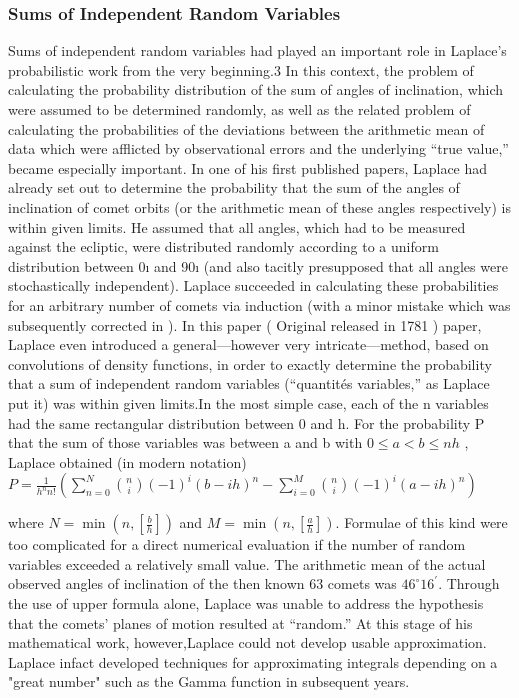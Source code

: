\documentclass{article}
\begin{document}
\subsubsection{Sums of Independent Random Variables}
Sums of independent random variables had played an important role in Laplace’s
probabilistic work from the very beginning.3 In this context, the problem of calculating the probability distribution of the sum of angles of inclination, which were
assumed to be determined randomly, as well as the related problem of calculating
the probabilities of the deviations between the arithmetic mean of data which were
afflicted by observational errors and the underlying “true value,” became especially
important. In one of his first published papers, Laplace \cite{Fischer2010History} had already set out to
determine the probability that the sum of the angles of inclination of comet orbits (or
the arithmetic mean of these angles respectively) is within given limits. He assumed
that all angles, which had to be measured against the ecliptic, were distributed randomly according to a uniform distribution between 0ı and 90ı (and also tacitly
presupposed that all angles were stochastically independent). Laplace succeeded in
calculating these probabilities for an arbitrary number of comets via induction (with
a minor mistake which was subsequently corrected in \cite{Laplace2012Pierre}).
In this paper ( Original released in 1781 ) paper, Laplace even introduced a general—however very intricate—method, based
on convolutions of density functions, in order to exactly determine the probability
that a sum of independent random variables (“quantités variables,” as Laplace put it)
was within given limits.In the most simple case, each of the n variables had the
same rectangular distribution between 0 and h. For the probability P that the sum
of those variables was between a and b with $ 0 \leq a< b \leq nh $ , Laplace obtained (in
modern notation)
$ P= \frac{1}{h^{n}n!}(\sum\limits_{n=0}^{N}\binom{n}{i}(-1)^{i}(b-ih)^{n}- \sum\limits_{i=0}^{M}\binom{n}{i}(-1)^{i}(a-ih)^{n}  ) $

where $ N= \min(n,[\frac{b}{h}]) $ and $ M= \min(n,[\frac{a}{h}])$.
Formulae of this kind were too complicated for a direct numerical evaluation if the number of random variables exceeded a relatively small value. The arithmetic mean of the actual observed angles of inclination of the then known 63 comets was $46^{\circ} 16^{\prime} $. Through the use of upper formula  alone, Laplace was unable to address the hypothesis that the comets’ planes of motion resulted at “random.” At this stage of his mathematical work, however,Laplace could not develop usable approximation.
Laplace infact developed techniques for approximating integrals depending on a "great number" such as the Gamma function in subsequent years.
\end{document}
